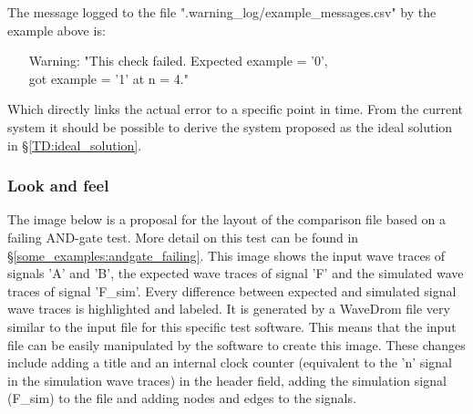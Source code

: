 The message logged to the file ".warning\_log/example\_messages.csv" by the example above is:
\begin{customenv}
	\label{log:error_message}
	\begin{itemize}
		\caption{Example error message}
		\centering
		\item [Warning:] "This check failed. Expected example = '0', \\
		got example = '1' at n = 4."
	\end{itemize}
\end{customenv}\nline
Which directly links the actual error to a specific point in time. From the current system it should be possible to derive the system proposed as the ideal solution in §\ref{TD:ideal_solution}.\newpage
\subsubsection{Look and feel}
The image below is a proposal for the layout of the comparison file based on a failing AND-gate test. More detail on this test can be found in §\ref{some_examples:andgate_failing}.
\nline
This image shows the input wave traces of signals 'A' and 'B', the expected wave traces of signal 'F' and the simulated wave traces of signal 'F\_sim'. Every difference between expected and simulated signal wave traces is highlighted and labeled.
\npar
It is generated by a WaveDrom file very similar to the input file for this specific test software. This means that the input file can be easily manipulated by the software to create this image.
\npar
These changes include adding a title and an internal clock counter (equivalent to the 'n' signal in the simulation wave traces) in the header field, adding the simulation signal (F\_sim) to the file and adding nodes and edges to the signals.\newpage
